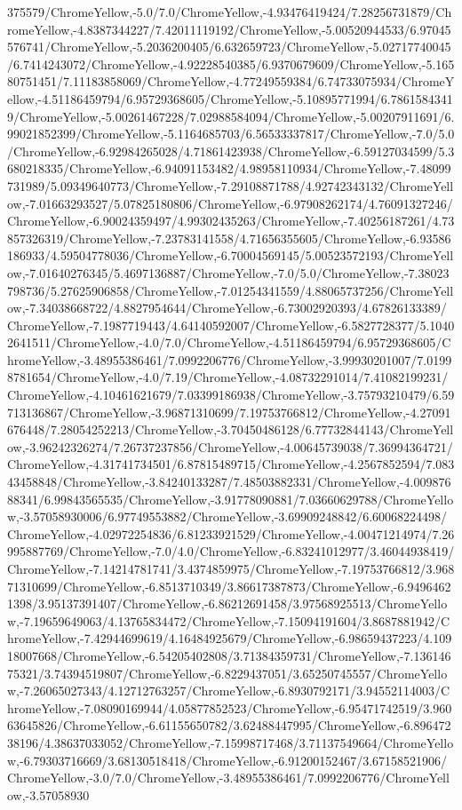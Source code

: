 {\begin{tikzternal}
375579/ChromeYellow,-5.0/7.0/ChromeYellow,-4.93476419424/7.28256731879/ChromeYellow,-4.8387344227/7.42011119192/ChromeYellow,-5.00520944533/6.97045576741/ChromeYellow,-5.2036200405/6.632659723/ChromeYellow,-5.02717740045/6.7414243072/ChromeYellow,-4.92228540385/6.9370679609/ChromeYellow,-5.16580751451/7.11183858069/ChromeYellow,-4.77249559384/6.74733075934/ChromeYellow,-4.51186459794/6.95729368605/ChromeYellow,-5.10895771994/6.78615843419/ChromeYellow,-5.00261467228/7.02988584094/ChromeYellow,-5.00207911691/6.99021852399/ChromeYellow,-5.1164685703/6.56533337817/ChromeYellow,-7.0/5.0/ChromeYellow,-6.92984265028/4.71861423938/ChromeYellow,-6.59127034599/5.3680218335/ChromeYellow,-6.94091153482/4.98958110934/ChromeYellow,-7.48099731989/5.09349640773/ChromeYellow,-7.29108871788/4.92742343132/ChromeYellow,-7.01663293527/5.07825180806/ChromeYellow,-6.97908262174/4.76091327246/ChromeYellow,-6.90024359497/4.99302435263/ChromeYellow,-7.40256187261/4.73857326319/ChromeYellow,-7.23783141558/4.71656355605/ChromeYellow,-6.93586186933/4.59504778036/ChromeYellow,-6.70004569145/5.00523572193/ChromeYellow,-7.01640276345/5.4697136887/ChromeYellow,-7.0/5.0/ChromeYellow,-7.38023798736/5.27625906858/ChromeYellow,-7.01254341559/4.88065737256/ChromeYellow,-7.34038668722/4.8827954644/ChromeYellow,-6.73002920393/4.67826133389/ChromeYellow,-7.1987719443/4.64140592007/ChromeYellow,-6.5827728377/5.10402641511/ChromeYellow,-4.0/7.0/ChromeYellow,-4.51186459794/6.95729368605/ChromeYellow,-3.48955386461/7.0992206776/ChromeYellow,-3.99930201007/7.01998781654/ChromeYellow,-4.0/7.19/ChromeYellow,-4.08732291014/7.41082199231/ChromeYellow,-4.10461621679/7.03399186938/ChromeYellow,-3.75793210479/6.59713136867/ChromeYellow,-3.96871310699/7.19753766812/ChromeYellow,-4.27091676448/7.28054252213/ChromeYellow,-3.70450486128/6.77732844143/ChromeYellow,-3.96242326274/7.26737237856/ChromeYellow,-4.00645739038/7.36994364721/ChromeYellow,-4.31741734501/6.87815489715/ChromeYellow,-4.2567852594/7.08343458848/ChromeYellow,-3.84240133287/7.48503882331/ChromeYellow,-4.00987688341/6.99843565535/ChromeYellow,-3.91778090881/7.03660629788/ChromeYellow,-3.57058930006/6.97749553882/ChromeYellow,-3.69909248842/6.60068224498/ChromeYellow,-4.02972254836/6.81233921529/ChromeYellow,-4.00471214974/7.26995887769/ChromeYellow,-7.0/4.0/ChromeYellow,-6.83241012977/3.46044938419/ChromeYellow,-7.14214781741/3.4374859975/ChromeYellow,-7.19753766812/3.96871310699/ChromeYellow,-6.8513710349/3.86617387873/ChromeYellow,-6.94964621398/3.95137391407/ChromeYellow,-6.86212691458/3.97568925513/ChromeYellow,-7.19659649063/4.13765834472/ChromeYellow,-7.15094191604/3.8687881942/ChromeYellow,-7.42944699619/4.16484925679/ChromeYellow,-6.98659437223/4.10918007668/ChromeYellow,-6.54205402808/3.71384359731/ChromeYellow,-7.13614675321/3.74394519807/ChromeYellow,-6.8229437051/3.65250745557/ChromeYellow,-7.26065027343/4.12712763257/ChromeYellow,-6.8930792171/3.94552114003/ChromeYellow,-7.08090169944/4.05877852523/ChromeYellow,-6.95471742519/3.96063645826/ChromeYellow,-6.61155650782/3.62488447995/ChromeYellow,-6.89647238196/4.38637033052/ChromeYellow,-7.15998717468/3.71137549664/ChromeYellow,-6.79303716669/3.68130518418/ChromeYellow,-6.91200152467/3.67158521906/ChromeYellow,-3.0/7.0/ChromeYellow,-3.48955386461/7.0992206776/ChromeYellow,-3.57058930
\end{tikzternal}}
